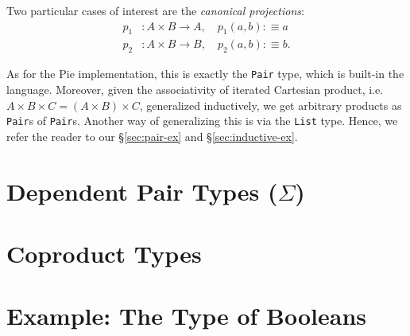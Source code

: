 Two particular cases of interest are the \emph{canonical projections}:
\begin{align*}
  p_1 & : A \times B \to A, \quad p_1(a, b) :\equiv a \\
  p_2 & : A \times B \to B, \quad p_2(a, b) :\equiv b.
\end{align*}

\vspace{0.3cm}

As for the Pie implementation, this is exactly the \texttt{Pair} type, which
is built-in the language. Moreover, given the associativity of iterated
Cartesian product, i.e.\ $ A \times B \times C = (A \times B) \times C $,
generalized inductively, we get arbitrary products as \texttt{Pair}s of
\texttt{Pair}s. Another way of generalizing this is via the \texttt{List}
type. Hence, we refer the reader to our \S\ref{sec:pair-ex} and \S\ref{sec:inductive-ex}.


\section{Dependent Pair Types ($ \Sigma $)}


\section{Coproduct Types}


\section{Example: The Type of Booleans}



